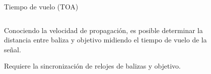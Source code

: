 \documentclass{beamer}
\begin{document}


    \begin{frame}{Tiempo de vuelo (TOA)}
      \begin{columns}
        \begin{column}{0.5\textwidth}
          Conociendo la velocidad de propagación, es posible determinar la distancia entre baliza y objetivo midiendo el tiempo de vuelo de la señal.

          \vspace{.5cm}
          Requiere la sincronización de relojes de balizas y objetivo.
        \end{column}
        \begin{column}{0.5\textwidth}  
          \begin{figure}[H]
            \centering
            \def\svgwidth{\linewidth}
            
            \label{fig:TOA}
        \end{figure}
        \end{column}
      \end{columns}
    \end{frame}
\end{document}
